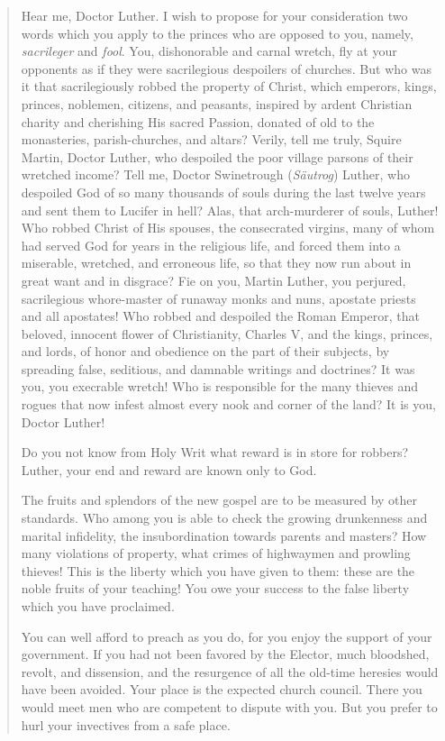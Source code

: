 \begin{quote}
Hear me, Doctor Luther. I wish to propose for your consideration two
words which you apply to the princes who are opposed to you, namely, \textit{sacrileger}
and \textit{fool}. You, dishonorable and carnal wretch, fly at your opponents
as if they were sacrilegious despoilers of churches. But who was it that
sacrilegiously robbed the property of Christ, which emperors, kings, princes,
noblemen, citizens, and peasants, inspired by ardent Christian charity and
cherishing His sacred Passion, donated of old to the monasteries, parish-churches,
and altars? Verily, tell me truly, Squire Martin, Doctor Luther,
who despoiled the poor village parsons of their wretched income? Tell me,
Doctor Swinetrough (\textit{Säutrog}) Luther, who despoiled God of so many thousands
of souls during the last twelve years and sent them to Lucifer in hell?
Alas, that arch-murderer of souls, Luther! Who robbed Christ of His spouses,
the consecrated virgins, many of whom had served God for years in the
religious life, and forced them into a miserable, wretched, and erroneous life,
so that they now run about in great want and in disgrace? Fie on you,
Martin Luther, you perjured, sacrilegious whore-master of runaway monks
and nuns, apostate priests and all apostates! Who robbed and despoiled the
Roman Emperor, that beloved, innocent flower of Christianity, Charles V,
and the kings, princes, and lords, of honor and obedience on the part of their
subjects, by spreading false, seditious, and damnable writings and doctrines?
It was you, you execrable wretch! Who is responsible for the many thieves
and rogues that now infest almost every nook and corner of the land? It is
you, Doctor Luther!

Do you not know from Holy Writ what reward is in store for robbers?
Luther, your end and reward are known only to God.

The fruits and splendors of the new gospel are to be measured by other
standards. Who among you is able to check the growing drunkenness and
marital infidelity, the insubordination towards parents and masters? How
many violations of property, what crimes of highwaymen and prowling
thieves! This is the liberty which you have given to them: these are the
noble fruits of your teaching! You owe your success to the false liberty
which you have proclaimed.

You can well afford to preach as you do, for you enjoy the support of
your government. If you had not been favored by the Elector, much bloodshed,
revolt, and dissension, and the resurgence of all the old-time heresies
would have been avoided. Your place is the expected church council. There
you would meet men who are competent to dispute with you. But you prefer
to hurl your invectives from a safe place.


\end{quote}
